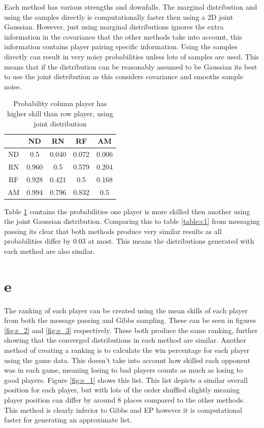 \documentclass[twoside,twocolumn]{article}
\begin{document}
Each method has various strengths and downfalls. The marginal distribution and using the samples directly is computationally faster then using a 2D joint Gaussian. However, just using marginal distributions ignores the extra information in the covariance that the other methods take into account, this information contains player pairing specific information. Using the samples directly can result in very noisy probabilities unless lots of samples are used. This means that if the distribution can be reasonably assumed to be Gaussian its best to use the joint distribution as this considers covariance and smooths sample noise. 

\begin{table}[h]
\centering
\begin{tabular}{ c | c  c  c  c}
&ND&RN&RF&AM\\ 

\midrule
ND&0.5  &   0.040 & 0.072 &0.006\\
RN&0.960&0.5&0.579&0.204\\
RF&0.928&0.421&0.5&0.168 \\
AM&0.994&0.796&0.832&0.5\\
\end{tabular}
\caption{Probability column player has higher skill than row player, using joint distribution}
\label{table:d2}
\end{table}
 Table \ref{table:d2} contains the probabilities one player is more skilled then another using the joint Gaussian distribution. Comparing this to table \ref{table:c1} from messaging passing its clear that both methods produce very similar results as all probabilities differ by 0.03 at most. This means the distributions generated with each method are also similar.

\section{e}
The ranking of each player can be created using the mean skills of each player from both the message passing and Gibbs sampling. These can be seen in figures \ref{fig:e_2} and \ref{fig:e_3} respectively. These both produce the same ranking, further showing that the converged distributions in each method are similar. Another method of creating a ranking is to calculate the win percentage for each player using the game data. This doesn't take into account how skilled each opponent was in each game, meaning losing to bad players counts as much as losing to good players. Figure \ref{fig:e_1} shows this list. This list depicts a similar overall position for each player, but with lots of the order shuffled slightly meaning player position can differ by around 8 places compared to the other methods. This method is clearly inferior to Gibbs and EP however it is computational faster for generating an approximate list.
\end{document}
